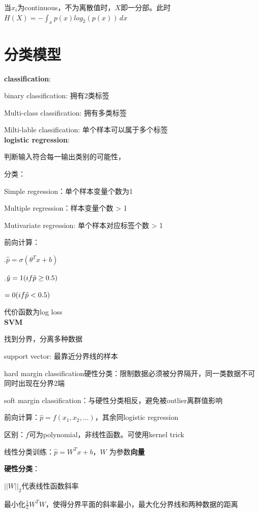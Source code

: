 \documentclass[UTF8]{ctexart}
\begin{document}
  当$x_i$为continuous，不为离散值时，$X$即一分部。此时$H(X) = -\int_{x} p(x)log_2(p(x))\,dx $
\section{分类模型}
\noindent \textbf{classification}:

  binary classification: 拥有2类标签

  Multi-class classification: 拥有多类标签

  Milti-lable classification: 单个样本可以属于多个标签\\
\textbf{logistic regression}:

  判断输入符合每一输出类别的可能性，

  分类：

  \quad Simple regression：单个样本变量个数为1

  \quad Multiple regression：样本变量个数 > 1

  \quad Mutivariate regression: 单个样本对应标签个数 > 1

  前向计算：
  
  .$\hat{p} = \sigma(\theta^Tx + b)$

  .$\hat{y} = 1\space (if \hat{p} \geq 0.5)$

  \quad \quad \quad $= 0\space (if \hat{p} < 0.5)$

  代价函数为log loss\\
\textbf{SVM}

  找到分界，分离多种数据

  support vector: 最靠近分界线的样本

  hard margin classification硬性分类：限制数据必须被分界隔开，同一类数据不可同时出现在分界2端

  soft margin classification：与硬性分类相反，避免被outlier离群值影响

  前向计算：$\hat{p} = f(x_1, x_2,...)$，其余同logistic regression

  \quad 区别：$f$可为polynomial，非线性函数。可使用kernel trick

  线性分类训练：$\hat{p} = W^Tx + b$，$W$ 为参数\textbf{向量}

  \quad \textbf{硬性分类}：

  \quad \quad $||W||_2$代表线性函数斜率

  \quad \quad 最小化$\frac{1}{2}W^TW$，使得分界平面的斜率最小，最大化分界线和两种数据的距离
\end{document}
